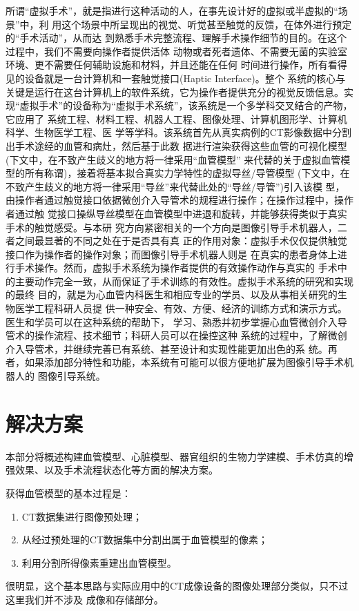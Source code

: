 所谓“虚拟手术”，就是指进行这种活动的人，在事先设计好的虚拟或半虚拟的“场景”中，利
用这个场景中所呈现出的视觉、听觉甚至触觉的反馈，在体外进行预定的“手术活动”，从而达
到熟悉手术完整流程、理解手术操作细节的目的。在这个过程中，我们不需要向操作者提供活体
动物或者死者遗体、不需要无菌的实验室环境、更不需要任何辅助设施和材料，并且还能在任何
时间进行操作，所有看得见的设备就是一台计算机和一套触觉接口(Haptic Interface)。整个
系统的核心与关键是运行在这台计算机上的软件系统，它为操作者提供充分的视觉反馈信息。实
现“虚拟手术”的设备称为“虚拟手术系统”，该系统是一个多学科交叉结合的产物，它应用了
系统工程、材料工程、机器人工程、图像处理、计算机图形学、计算机科学、生物医学工程、医
学等学科。该系统首先从真实病例的CT影像数据中分割出手术途经的血管和病灶，然后基于此数
据进行渲染获得这些血管的可视化模型(下文中，在不致产生歧义的地方将一律采用“血管模型”
来代替的关于虚拟血管模型的所有称谓)，接着将基本拟合真实力学特性的虚拟导丝/导管模型
(下文中，在不致产生歧义的地方将一律采用“导丝”来代替此处的“导丝/导管”)引入该模
型，由操作者通过触觉接口依据微创介入导管术的规程进行操作；在操作过程中，操作者通过触
觉接口操纵导丝模型在血管模型中进退和旋转，并能够获得类似于真实手术的触觉感受。与本研
究方向紧密相关的一个方向是图像引导手术机器人，二者之间最显著的不同之处在于是否具有真
正的作用对象：虚拟手术仅仅提供触觉接口作为操作者的操作对象；而图像引导手术机器人则是
在真实的患者身体上进行手术操作。然而，虚拟手术系统为操作者提供的有效操作动作与真实的
手术中的主要动作完全一致，从而保证了手术训练的有效性。虚拟手术系统的研究和实现的最终
目的，就是为心血管内科医生和相应专业的学员、以及从事相关研究的生物医学工程科研人员提
供一种安全、有效、方便、经济的训练方式和演示方式。医生和学员可以在这种系统的帮助下，
学习、熟悉并初步掌握心血管微创介入导管术的操作流程、技术细节；科研人员可以在操控这种
系统的过程中，了解微创介入导管术，并继续完善已有系统、甚至设计和实现性能更加出色的系
统。再者，如果添加部分特性和功能，本系统有可能可以很方便地扩展为图像引导手术机器人的
图像引导系统。

\section{解决方案}
\label{sec1-3}

本部分将概述构建血管模型、心脏模型、器官组织的生物力学建模、手术仿真的增强效果、以及手术流程状态化等方面的解决方案。

获得血管模型的基本过程是\cite{Preim2008Review}：
\begin{enumerate}
  \item CT数据集进行图像预处理；
  \item 从经过预处理的CT数据集中分割出属于血管模型的像素；
  \item 利用分割所得像素重建出血管模型。
\end{enumerate}
很明显，这个基本思路与实际应用中的CT成像设备的图像处理部分类似，只不过这里我们并不涉及
成像和存储部分。

